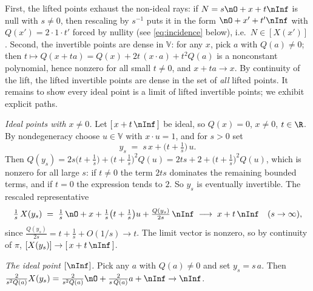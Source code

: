 First, the lifted points exhaust the non-ideal rays: if $N = s\nO + x + t\nInf$ is null with $s \neq 0$, then rescaling by $s^{-1}$ puts it in the form $\nO + x' + t'\nInf$ with $Q(x') = 2 \cdot 1 \cdot t'$ forced by nullity (see \eqref{eq:incidence} below), i.e.\ $N \in [X(x')]$. Second, the invertible points are dense in $\mathbb{V}$: for any $x$, pick $a$ with $Q(a) \neq 0$; then $t \mapsto Q(x + ta) = Q(x) + 2t\,(x \cdot a) + t^2 Q(a)$ is a nonconstant polynomial, hence nonzero for all small $t \neq 0$, and $x + ta \to x$. By continuity of the lift, the lifted invertible points are dense in the set of \emph{all} lifted points. It remains to show every ideal point is a limit of lifted invertible points; we exhibit explicit paths.

\emph{Ideal points with $x \neq 0$.} Let $[\,x + t\,\nInf\,]$ be ideal, so $Q(x) = 0$, $x \neq 0$, $t \in \R$. By nondegeneracy choose $u \in \mathbb{V}$ with $x \cdot u = 1$, and for $s > 0$ set
\[
y_s \;=\; s\,x + \bigl(t + \tfrac{1}{s}\bigr)\,u .
\]
Then $Q(y_s) = 2s\bigl(t + \tfrac1s\bigr) + \bigl(t + \tfrac1s\bigr)^2 Q(u) = 2ts + 2 + \bigl(t + \tfrac1s\bigr)^2 Q(u)$, which is nonzero for all large $s$: if $t \neq 0$ the term $2ts$ dominates the remaining bounded terms, and if $t = 0$ the expression tends to $2$. So $y_s$ is eventually invertible. The rescaled representative
\[
\tfrac{1}{s}\,X(y_s) \;=\; \tfrac{1}{s}\,\nO + x + \tfrac{1}{s}\bigl(t + \tfrac1s\bigr)u + \tfrac{Q(y_s)}{2s}\,\nInf
\;\longrightarrow\; x + t\,\nInf \quad (s \to \infty),
\]
since $\tfrac{Q(y_s)}{2s} = t + \tfrac1s + O(1/s) \to t$. The limit vector is nonzero, so by continuity of $\pi$, $[X(y_s)] \to [\,x + t\,\nInf\,]$.

\emph{The ideal point $[\nInf]$.} Pick any $a$ with $Q(a) \neq 0$ and set $y_s = s\,a$. Then $\tfrac{2}{s^2 Q(a)} X(y_s) = \tfrac{2}{s^2 Q(a)} \nO + \tfrac{2}{s\,Q(a)}a + \nInf \to \nInf$.
